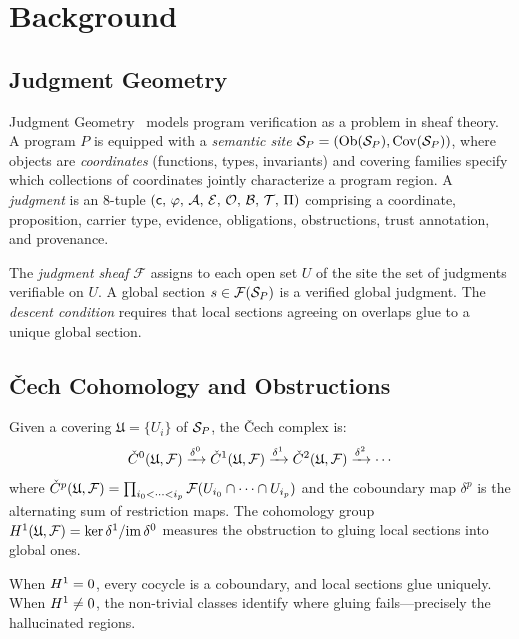 \documentclass[11pt]{article}
\begin{document}
\section{Background}\label{sec:background}

\subsection{Judgment Geometry}
Judgment Geometry~\cite{JuGeo2023} models program verification as a
problem in sheaf theory.  A program $P$ is equipped with a
\emph{semantic site} $\mathcal{S}_P = (\mathrm{Ob}(\mathcal{S}_P), \mathrm{Cov}(\mathcal{S}_P))$, where
objects are \emph{coordinates} (functions, types, invariants) and
covering families specify which collections of coordinates jointly
characterize a program region.  A \emph{judgment} is an 8-tuple
$(\mathsf{c},\,\varphi,\,\mathcal{A},\,\mathcal{E},\,\mathcal{O},\,\mathcal{B},\,\mathcal{T},\,\Pi)$
comprising a coordinate, proposition, carrier type, evidence, obligations,
obstructions, trust annotation, and provenance.

The \emph{judgment sheaf} $\mathcal{F}$ assigns to each open set $U$ of
the site the set of judgments verifiable on $U$.  A global section
$s \in \mathcal{F}(\mathcal{S}_P)$ is a verified global judgment.  The
\emph{descent condition} requires that local sections agreeing on
overlaps glue to a unique global section.

\subsection{\v{C}ech Cohomology and Obstructions}
Given a covering $\mathfrak{U} = \{U_i\}$ of $\mathcal{S}_P$, the \v{C}ech
complex is:
\[
  \check{C}^0(\mathfrak{U}, \mathcal{F})
  \xrightarrow{\delta^0}
  \check{C}^1(\mathfrak{U}, \mathcal{F})
  \xrightarrow{\delta^1}
  \check{C}^2(\mathfrak{U}, \mathcal{F})
  \xrightarrow{\delta^2} \cdots
\]
where $\check{C}^p(\mathfrak{U}, \mathcal{F}) = \prod_{i_0 < \cdots < i_p}
\mathcal{F}(U_{i_0} \cap \cdots \cap U_{i_p})$ and the coboundary map
$\delta^p$ is the alternating sum of restriction maps.  The cohomology
group $H^{1}(\mathfrak{U}, \mathcal{F}) = \ker \delta^1 / \mathrm{im}\,\delta^0$
measures the obstruction to gluing local sections into global ones.

When $H^{1} = 0$, every cocycle is a coboundary, and local sections
glue uniquely.  When $H^{1} \neq 0$, the non-trivial classes
identify where gluing fails---precisely the hallucinated regions.
\end{document}
